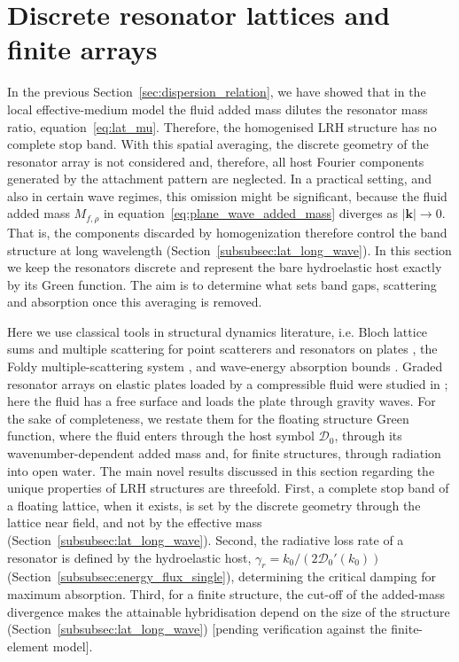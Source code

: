 \section{Discrete resonator lattices and finite arrays}\label{sec:discrete_lattice}

In the previous Section~\ref{sec:dispersion_relation}, we have showed that in the local effective-medium model the fluid added mass dilutes the resonator mass ratio, equation~\eqref{eq:lat_mu}. Therefore, the homogenised LRH structure has no complete stop band.  With this spatial averaging, the discrete geometry of the resonator array is not considered and, therefore, all host Fourier components generated by the attachment pattern are neglected. In a practical setting, and also in certain wave regimes, this omission might be significant, because the fluid added mass $M_{f,\rho}$ in equation~\eqref{eq:plane_wave_added_mass} diverges as $|\mathbf{k}|\to0$. That is, the components discarded by homogenization therefore control the band structure at long wavelength (Section~\ref{subsubsec:lat_long_wave}). In this section we keep the resonators discrete and represent the bare hydroelastic host exactly by its Green function. The aim is to determine what sets band gaps, scattering and absorption once this averaging is removed.

Here we use classical tools in structural dynamics literature, i.e. Bloch lattice sums and multiple scattering for point scatterers and resonators on plates \cite{evans2007penetration,movchan2007bloch,xiao2012flexural,torrent2013elastic}, the Foldy multiple-scattering system \cite{foldy1945multiple,martin2006multiple}, and wave-energy absorption bounds \cite{budal1975resonant,evans1976theory,falnes1980radiation}. Graded resonator arrays on elastic plates loaded by a compressible fluid were studied in \cite{skelton2018multiphysics}; here the fluid has a free surface and loads the plate through gravity waves. For the sake of completeness, we restate them for the floating structure Green function, where the fluid enters through the host symbol $\mathcal{D}_0$, through its wavenumber-dependent added mass and, for finite structures, through radiation into open water. The main novel results discussed in this section regarding the unique properties of LRH structures are threefold. First, a complete stop band of a floating lattice, when it exists, is set by the discrete geometry through the lattice near field, and not by the effective mass (Section~\ref{subsubsec:lat_long_wave}). Second, the radiative loss rate of a resonator is defined by the hydroelastic host, $\gamma_r=k_0/(2\mathcal{D}_0'(k_0))$ (Section~\ref{subsubsec:energy_flux_single}), determining the critical damping for maximum absorption. {\color{red}Third, for a finite structure, the cut-off of the added-mass divergence makes the attainable hybridisation depend on the size of the structure (Section~\ref{subsubsec:lat_long_wave}) [pending verification against the finite-element model].}

